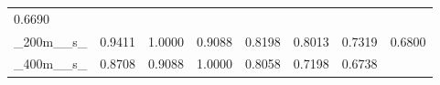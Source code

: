 \documentclass[11pt]{article}
\begin{document}
\begin{longtable}[]{@{}llllllll@{}}
\begin{minipage}[t]{0.10\columnwidth}
0.6690\strut
\end{minipage}\tabularnewline
\begin{minipage}[t]{0.10\columnwidth}\raggedright
\_200m\_\_s\_\strut
\end{minipage} & \begin{minipage}[t]{0.10\columnwidth}\raggedright
0.9411\strut
\end{minipage} & \begin{minipage}[t]{0.10\columnwidth}\raggedright
1.0000\strut
\end{minipage} & \begin{minipage}[t]{0.10\columnwidth}\raggedright
0.9088\strut
\end{minipage} & \begin{minipage}[t]{0.10\columnwidth}\raggedright
0.8198\strut
\end{minipage} & \begin{minipage}[t]{0.10\columnwidth}\raggedright
0.8013\strut
\end{minipage} & \begin{minipage}[t]{0.10\columnwidth}\raggedright
0.7319\strut
\end{minipage} & \begin{minipage}[t]{0.10\columnwidth}\raggedright
0.6800\strut
\end{minipage}\tabularnewline
\begin{minipage}[t]{0.10\columnwidth}\raggedright
\_400m\_\_s\_\strut
\end{minipage} & \begin{minipage}[t]{0.10\columnwidth}\raggedright
0.8708\strut
\end{minipage} & \begin{minipage}[t]{0.10\columnwidth}\raggedright
0.9088\strut
\end{minipage} & \begin{minipage}[t]{0.10\columnwidth}\raggedright
1.0000\strut
\end{minipage} & \begin{minipage}[t]{0.10\columnwidth}\raggedright
0.8058\strut
\end{minipage} & \begin{minipage}[t]{0.10\columnwidth}\raggedright
0.7198\strut
\end{minipage} & \begin{minipage}[t]{0.10\columnwidth}\raggedright
0.6738\strut
\end{minipage} & \begin{minipage}[t]{0.10\columnwidth}\raggedright

\end{minipage}
\end{longtable}
\end{document}

